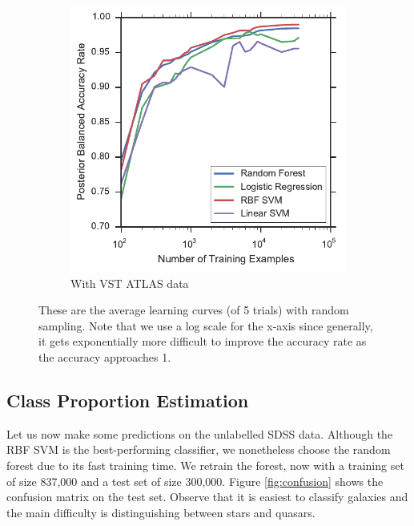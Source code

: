 \begin{figure}[tbp]
\begin{subfigure}{.5\textwidth}
		\includegraphics[width=0.99\linewidth]{figures/4_expt1/vstatlas_learning_curves}
		\caption{With VST ATLAS data}
		\label{fig:vstatlas_learning_curves}
	\end{subfigure}
	\caption[Learning curves with random sampling]{
		These are the average learning curves (of 5 trials) with random sampling.
		Note that we use a log scale for the x-axis since generally, it gets exponentially
		more difficult to improve the accuracy rate as the accuracy approaches 1.}
	\label{fig:learning_curves}
\end{figure}



\subsection{Class Proportion Estimation}
\label{sec:prop}

Let us now make some predictions on the unlabelled SDSS data. Although the RBF SVM is
the best-performing classifier, we nonetheless choose the random forest due to its fast
training time. We retrain the forest, now with a training set of size 837,000 and a test
set of size 300,000. Figure \ref{fig:confusion} shows the confusion matrix on the test set.
Observe that it is easiest to classify galaxies and the main difficulty is distinguishing
between stars and quasars.

